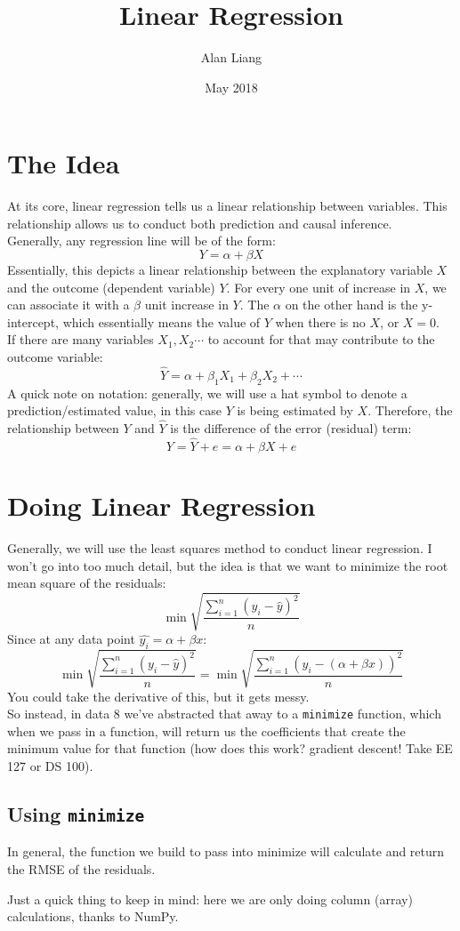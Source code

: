 \documentclass{article}
\title{Linear Regression}
\author{Alan Liang}
\date{May 2018}
\begin{document}
\maketitle
\section{The Idea}
At its core, linear regression tells us a linear relationship between variables.
This relationship allows us to conduct both prediction and causal inference.
\\
Generally, any regression line will be of the form:
$$Y = \alpha + \beta X$$
Essentially, this depicts a linear relationship between the explanatory variable $X$ and the outcome (dependent variable) $Y$. For every one unit of increase in $X$, we can associate it with a $\beta$ unit increase in $Y$.
The $\alpha$ on the other hand is the y-intercept, which essentially means the value of $Y$ when there is no $X$, or $X=0$. 
\\
If there are many variables $X_1,X_2\cdots$ to account for that may contribute to the outcome variable:
$$\hat{Y} = \alpha + \beta_1 X_1 + \beta_2 X_2 + \cdots$$
A quick note on notation: generally, we will use a hat symbol to denote a prediction/estimated value, in this case $Y$ is being estimated by $X$.
Therefore, the relationship between $Y$ and $\hat{Y}$ is the difference of the error (residual) term:
$$Y = \hat{Y} + e = \alpha + \beta X + e$$

\section{Doing Linear Regression}
Generally, we will use the least squares method to conduct linear regression.
I won't go into too much detail, but the idea is that we want to minimize the root mean square of the residuals:
$$\min{\sqrt{\frac{\sum_{i=1}^n (y_i - \hat{y})^2}{n}}}$$
Since at any data point $\hat{y_i} = \alpha + \beta x$:
$$\min{\sqrt{\frac{\sum_{i=1}^n (y_i - \hat{y})^2}{n}}} = \min{\sqrt{\frac{\sum_{i=1}^n (y_i - (\alpha + \beta x))^2}{n}}} $$
You could take the derivative of this, but it gets messy. 
\\
So instead, in data 8 we've abstracted that away to a \texttt{minimize} function, which when we pass in a function, will return us the coefficients that create the minimum value for that function (how does this work? gradient descent! Take EE 127 or DS 100).

\subsection{Using \texttt{minimize}}
In general, the function we build to pass into minimize will calculate and return the RMSE of the residuals.

Just a quick thing to keep in mind: here we are only doing column (array) calculations, thanks to NumPy.
\end{document}
